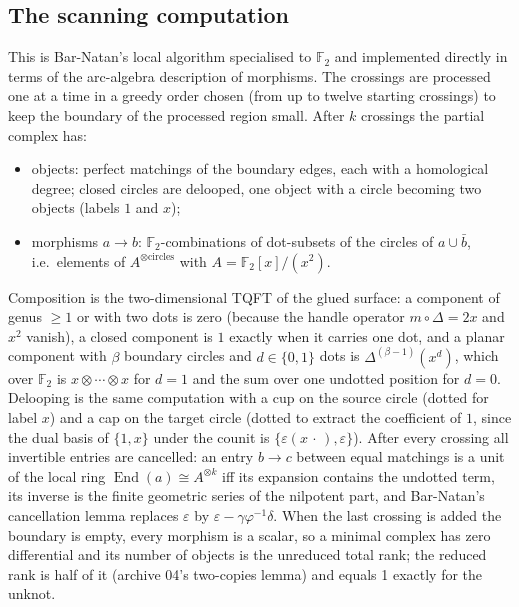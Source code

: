 \documentclass[11pt]{article}
\theoremstyle{remark}
\newcommand{\F}{\mathbb{F}_2}
\begin{document}
\subsection{The scanning computation}
This is Bar-Natan's local algorithm \cite{barnatan} specialised to $\F$ and
implemented directly in terms of the arc-algebra description of morphisms.
The crossings are processed one at a time in a greedy order chosen (from up to
twelve starting crossings) to keep the boundary of the processed region small.
After $k$ crossings the partial complex has:
\begin{itemize}
\item objects: perfect matchings of the boundary edges, each with a
  homological degree; closed circles are delooped, one object with a circle
  becoming two objects (labels $1$ and $x$);
\item morphisms $a\to b$: $\F$-combinations of dot-subsets of the circles of
  $a\cup\bar b$, i.e.\ elements of $A^{\otimes\text{circles}}$ with
  $A=\F[x]/(x^2)$.
\end{itemize}
Composition is the two-dimensional TQFT of the glued surface: a component of
genus $\ge1$ or with two dots is zero (because the handle operator
$m\circ\Delta=2x$ and $x^2$ vanish), a closed component is $1$ exactly when it
carries one dot, and a planar component with $\beta$ boundary circles and
$d\in\{0,1\}$ dots is $\Delta^{(\beta-1)}(x^d)$, which over $\F$ is
$x\otimes\cdots\otimes x$ for $d=1$ and the sum over one undotted position for
$d=0$. Delooping is the same computation with a cup on the source circle
(dotted for label $x$) and a cap on the target circle (dotted to extract the
coefficient of $1$, since the dual basis of $\{1,x\}$ under the counit is
$\{\varepsilon(x\,\cdot\,),\varepsilon\}$). After every crossing all invertible
entries are cancelled: an entry $b\to c$ between equal matchings is a unit of
the local ring $\operatorname{End}(a)\cong A^{\otimes k}$ iff its expansion
contains the undotted term, its inverse is the finite geometric series of the
nilpotent part, and Bar-Natan's cancellation lemma replaces
$\varepsilon$ by $\varepsilon-\gamma\varphi^{-1}\delta$. When the last crossing is
added the boundary is empty, every morphism is a scalar, so a minimal complex
has zero differential and its number of objects is the unreduced total rank;
the reduced rank is half of it (archive 04's two-copies lemma) and equals 1
exactly for the unknot.
\end{document}
